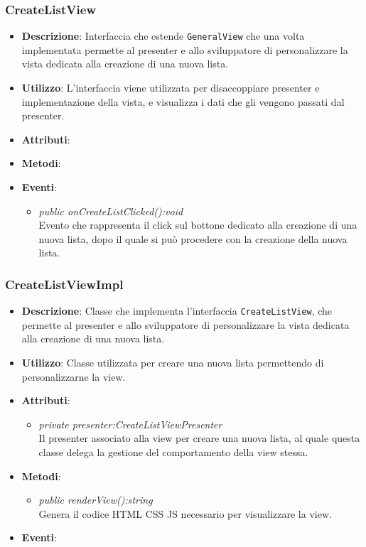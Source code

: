 \subsubsection{CreateListView}
\begin{itemize}
\item \textbf{Descrizione}: Interfaccia che estende \texttt{GeneralView} che una volta implementata permette al presenter e allo sviluppatore di personalizzare la vista dedicata alla creazione di una nuova lista.
\item \textbf{Utilizzo}: L'interfaccia viene utilizzata per disaccoppiare presenter e implementazione della vista, e visualizza i dati che gli vengono passati dal presenter.
\item \textbf{Attributi}:
\item \textbf{Metodi}:
\item \textbf{Eventi}:
	\begin{itemize}
	\item \textit{public onCreateListClicked():void}\\
	Evento che rappresenta il click sul bottone dedicato alla creazione di una nuova lista, dopo il quale si può procedere con la creazione della nuova lista.
	\end{itemize}
\end{itemize}

\subsubsection{CreateListViewImpl}
\begin{itemize}
\item \textbf{Descrizione}: Classe che implementa l'interfaccia \texttt{CreateListView}, che permette al presenter e allo sviluppatore di personalizzare la vista dedicata alla creazione di una nuova lista.
\item \textbf{Utilizzo}: Classe utilizzata per creare una nuova lista permettendo di personalizzarne la view.
\item \textbf{Attributi}: 
	\begin{itemize}
	\item \textit{private presenter:CreateListViewPresenter}\\
	Il presenter associato alla view per creare una nuova lista, al quale questa classe delega la gestione del comportamento della view stessa.
	\end{itemize}
\item \textbf{Metodi}:
	\begin{itemize}
	\item \textit{public renderView():string}\\
		Genera il codice HTML CSS JS necessario per visualizzare la view.
	\end{itemize}
\item \textbf{Eventi}:
\end{itemize}

